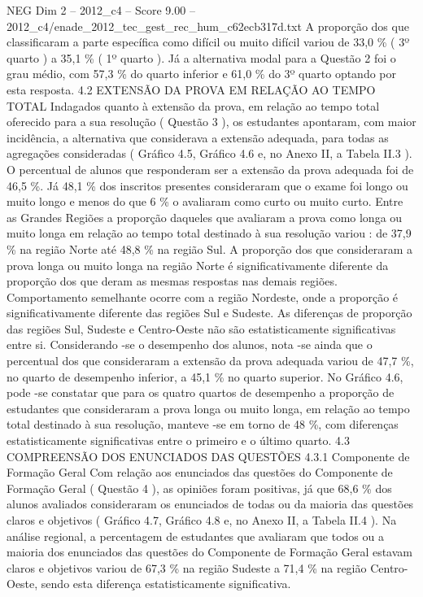 \begin{textsample}{NEG Dim 2 – 2012\_c4 – Score 9.00 – 2012\_c4/enade\_2012\_tec\_gest\_rec\_hum\_c62ecb317d.txt}
A proporção dos que classificaram a parte específica como difícil ou muito difícil variou de 33,0 \% ( 3º quarto ) a 35,1 \% ( 1º quarto ).
Já a alternativa modal para a Questão 2 foi o grau médio, com 57,3 \% do quarto inferior e 61,0 \% do 3º quarto optando por esta resposta. 4.2 EXTENSÃO DA PROVA EM RELAÇÃO AO TEMPO TOTAL Indagados quanto à extensão da prova, em relação ao tempo total oferecido para a sua resolução ( Questão 3 ), os estudantes apontaram, com maior incidência, a alternativa que considerava a extensão adequada, para todas as agregações consideradas ( Gráfico 4.5, Gráfico 4.6 e, no Anexo II, a Tabela II.3 ).
O percentual de alunos que responderam ser a extensão da prova adequada foi de 46,5 \%.
Já 48,1 \% dos inscritos presentes consideraram que o exame foi longo ou muito longo e menos do que 6 \% o avaliaram como curto ou muito curto.
Entre as Grandes Regiões a proporção daqueles que avaliaram a prova como longa ou muito longa em relação ao tempo total destinado à sua resolução variou : de 37,9 \% na região Norte até 48,8 \% na região Sul.
A proporção dos que consideraram a prova longa ou muito longa na região Norte é significativamente diferente da proporção dos que deram as mesmas respostas nas demais regiões.
Comportamento semelhante ocorre com a região Nordeste, onde a proporção é significativamente diferente das regiões Sul e Sudeste.
As diferenças de proporção das regiões Sul, Sudeste e Centro-Oeste não são estatisticamente significativas entre si.
Considerando -se o desempenho dos alunos, nota -se ainda que o percentual dos que consideraram a extensão da prova adequada variou de 47,7 \%, no quarto de desempenho inferior, a 45,1 \% no quarto superior.
No Gráfico 4.6, pode -se constatar que para os quatro quartos de desempenho a proporção de estudantes que consideraram a prova longa ou muito longa, em relação ao tempo total destinado à sua resolução, manteve -se em torno de 48 \%, com diferenças estatisticamente significativas entre o primeiro e o último quarto. 4.3 COMPREENSÃO DOS ENUNCIADOS DAS QUESTÕES 4.3.1 Componente de Formação Geral Com relação aos enunciados das questões do Componente de Formação Geral ( Questão 4 ), as opiniões foram positivas, já que 68,6 \% dos alunos avaliados consideraram os enunciados de todas ou da maioria das questões claros e objetivos ( Gráfico 4.7, Gráfico 4.8 e, no Anexo II, a Tabela II.4 ).
Na análise regional, a percentagem de estudantes que avaliaram que todos ou a maioria dos enunciados das questões do Componente de Formação Geral estavam claros e objetivos variou de 67,3 \% na região Sudeste a 71,4 \% na região Centro-Oeste, sendo esta diferença estatisticamente significativa.

\end{textsample}
